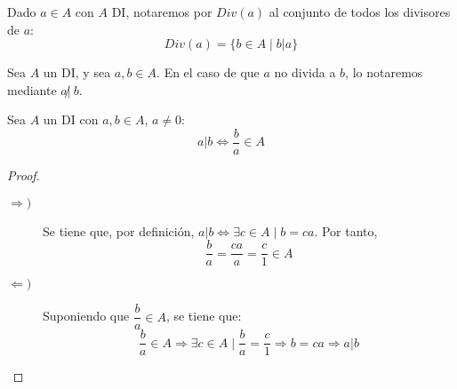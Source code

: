 \begin{notacion}
    Dado $a \in A$ con $A$ DI, notaremos por $Div(a)$ al conjunto de todos los divisores de $a$:
    $$Div(a) = \{b \in A \mid b|a \}$$
\end{notacion}

\begin{notacion}
    Sea $A$ un DI, y sea $a,b\in A$. En el caso de que $a$ no divida a $b$, lo notaremos mediante $a\not|~b$.
\end{notacion}

\begin{lema}
    Sea $A$ un DI con $a,b \in A$, $a \neq 0$:
    $$a|b \Longleftrightarrow \dfrac{b}{a} \in A$$
\end{lema}
\begin{proof}\
\begin{description}
    \item[$\Longrightarrow)$] Se tiene que, por definición, $a|b \Longleftrightarrow \exists c \in A \mid b = ca$. Por tanto,
    $$\dfrac{b}{a} = \dfrac{ca}{a} = \dfrac{c}{1} \in A$$
    \item[$\Longleftarrow)$] Suponiendo que $\dfrac{b}{a} \in A$, se tiene que:
    $$\dfrac{b}{a} \in A \Longrightarrow \exists c \in A \mid \dfrac{b}{a} = \dfrac{c}{1} \Longrightarrow b = ca \Longrightarrow a|b$$
\end{description}
\end{proof}

